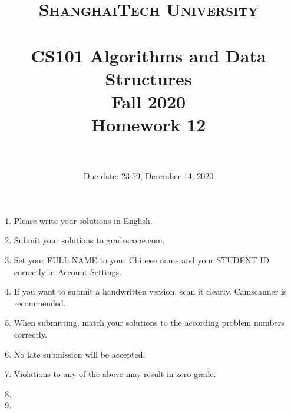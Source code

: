 \documentclass[10.5pt]{article}
\title{
	\normalfont \normalsize
	\textsc{ShanghaiTech University} \\ [25pt]
	\horrule{0.5pt} \\[0.4cm] %
	\huge CS101 Algorithms and Data Structures\\ %
	\LARGE Fall 2020\\
	\LARGE Homework 12\\
	\horrule{2pt} \\[0.5cm] %
}
\author{}
\date{Due date: 23:59, December 14, 2020}
\begin{document}
	
	\maketitle
	\thispagestyle{firstpage}
	\vspace{3ex}
	
	\begin{enumerate}
		\item Please write your solutions in English. 
		
		\item Submit your solutions to gradescope.com.  
		
		\item Set your FULL NAME to your Chinese name and your STUDENT ID correctly in Account Settings. 
		
		\item If you want to submit a handwritten version, scan it clearly. Camscanner is recommended. 
		
		\item When submitting, match your solutions to the according problem numbers correctly. 
		
		\item No late submission will be accepted.
		
		\item Violations to any of the above may result in zero grade.
		
		\item {\large\color{red}{In this homework, all the algorithm design part need the three part proof. The demand is in the next page. If you do not use the three part proof, you will not get any point.}}

\item {\large\color{red}{In the algorithm design problem, you should design the correct algorithm whose running time is equal or smaller than the correct answer. If it's larger than the correct answer, you cannot get any point.}}
	\end{enumerate}
	\newpage
\end{document}
